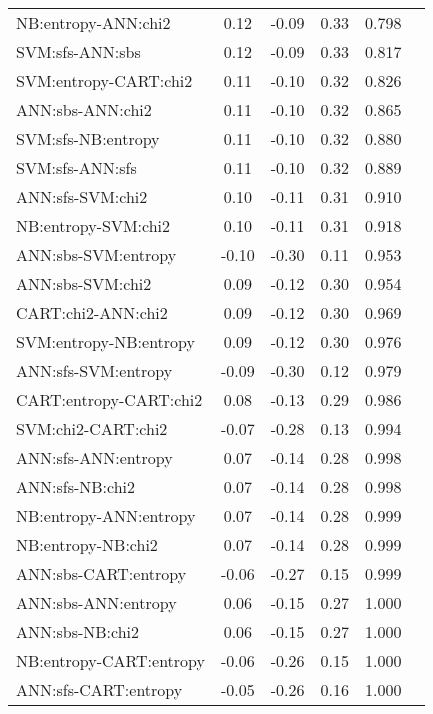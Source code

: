 \begin{center}
\begin{longtable}{|l|c|c|c|c|l}
      NB:entropy-ANN:chi2 &   0.12 &  -0.09 &   0.33 &  0.798 &      \\
          SVM:sfs-ANN:sbs &   0.12 &  -0.09 &   0.33 &  0.817 &      \\
    SVM:entropy-CART:chi2 &   0.11 &  -0.10 &   0.32 &  0.826 &      \\
         ANN:sbs-ANN:chi2 &   0.11 &  -0.10 &   0.32 &  0.865 &      \\
       SVM:sfs-NB:entropy &   0.11 &  -0.10 &   0.32 &  0.880 &      \\
          SVM:sfs-ANN:sfs &   0.11 &  -0.10 &   0.32 &  0.889 &      \\
         ANN:sfs-SVM:chi2 &   0.10 &  -0.11 &   0.31 &  0.910 &      \\
      NB:entropy-SVM:chi2 &   0.10 &  -0.11 &   0.31 &  0.918 &      \\
      ANN:sbs-SVM:entropy &  -0.10 &  -0.30 &   0.11 &  0.953 &      \\
         ANN:sbs-SVM:chi2 &   0.09 &  -0.12 &   0.30 &  0.954 &      \\
       CART:chi2-ANN:chi2 &   0.09 &  -0.12 &   0.30 &  0.969 &      \\
   SVM:entropy-NB:entropy &   0.09 &  -0.12 &   0.30 &  0.976 &      \\
      ANN:sfs-SVM:entropy &  -0.09 &  -0.30 &   0.12 &  0.979 &      \\
   CART:entropy-CART:chi2 &   0.08 &  -0.13 &   0.29 &  0.986 &      \\
       SVM:chi2-CART:chi2 &  -0.07 &  -0.28 &   0.13 &  0.994 &      \\
      ANN:sfs-ANN:entropy &   0.07 &  -0.14 &   0.28 &  0.998 &      \\
          ANN:sfs-NB:chi2 &   0.07 &  -0.14 &   0.28 &  0.998 &      \\
   NB:entropy-ANN:entropy &   0.07 &  -0.14 &   0.28 &  0.999 &      \\
       NB:entropy-NB:chi2 &   0.07 &  -0.14 &   0.28 &  0.999 &      \\
     ANN:sbs-CART:entropy &  -0.06 &  -0.27 &   0.15 &  0.999 &      \\
      ANN:sbs-ANN:entropy &   0.06 &  -0.15 &   0.27 &  1.000 &      \\
          ANN:sbs-NB:chi2 &   0.06 &  -0.15 &   0.27 &  1.000 &      \\
  NB:entropy-CART:entropy &  -0.06 &  -0.26 &   0.15 &  1.000 &      \\
     ANN:sfs-CART:entropy &  -0.05 &  -0.26 &   0.16 &  1.000 &      \\

\end{longtable}
\end{center}
